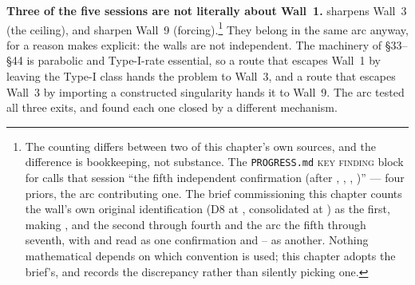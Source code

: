 \textbf{Three of the five sessions are not literally about Wall~1.} 
sharpens Wall~3 (the ceiling),  and  sharpen Wall~9
(forcing).\footnote{The counting differs between two of this chapter's own
sources, and the difference is bookkeeping, not substance. The
\texttt{PROGRESS.md} \textsc{key finding} block for  calls that session
``the fifth independent confirmation (after , , ,
)'' --- four priors, the arc contributing one. The brief commissioning
this chapter counts the wall's own original identification (D8 at ,
consolidated at ) as the first, making ,  and  the
second through fourth and the arc the fifth through seventh, with  and
 read as one confirmation and -- as another. Nothing
mathematical depends on which convention is used; this chapter adopts the
brief's, and records the discrepancy rather than silently picking one.} They
belong in the same arc anyway, for a reason  makes explicit: the walls
are not independent. The machinery of \S33--\S44 is parabolic and Type-I-rate
essential, so a route that escapes Wall~1 by leaving the Type-I class hands the
problem to Wall~3, and a route that escapes Wall~3 by importing a constructed
singularity hands it to Wall~9. The arc tested all three exits, and found each
one closed by a different mechanism.

